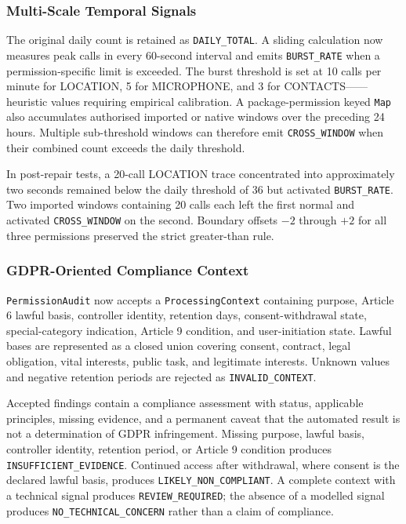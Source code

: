 \subsubsection{Multi-Scale Temporal Signals}

The original daily count is retained as \texttt{DAILY\_TOTAL}. A sliding calculation now measures peak calls in every 60-second interval and emits \texttt{BURST\_RATE} when a permission-specific limit is exceeded. The burst threshold is set at 10 calls per minute for LOCATION, 5 for MICROPHONE, and 3 for CONTACTS——heuristic values requiring empirical calibration. A package-permission keyed \texttt{Map} also accumulates authorised imported or native windows over the preceding 24 hours. Multiple sub-threshold windows can therefore emit \texttt{CROSS\_WINDOW} when their combined count exceeds the daily threshold.

In post-repair tests, a 20-call LOCATION trace concentrated into approximately two seconds remained below the daily threshold of 36 but activated \texttt{BURST\_RATE}. Two imported windows containing 20 calls each left the first normal and activated \texttt{CROSS\_WINDOW} on the second. Boundary offsets \(-2\) through \(+2\) for all three permissions preserved the strict greater-than rule.

\subsubsection{GDPR-Oriented Compliance Context}

\texttt{PermissionAudit} now accepts a \texttt{ProcessingContext} containing purpose, Article 6 lawful basis, controller identity, retention days, consent-withdrawal state, special-category indication, Article 9 condition, and user-initiation state. Lawful bases are represented as a closed union covering consent, contract, legal obligation, vital interests, public task, and legitimate interests. Unknown values and negative retention periods are rejected as \texttt{INVALID\_CONTEXT}.

Accepted findings contain a compliance assessment with status, applicable principles, missing evidence, and a permanent caveat that the automated result is not a determination of GDPR infringement. Missing purpose, lawful basis, controller identity, retention period, or Article 9 condition produces \texttt{INSUFFICIENT\_EVIDENCE}. Continued access after withdrawal, where consent is the declared lawful basis, produces \texttt{LIKELY\_NON\_COMPLIANT}. A complete context with a technical signal produces \texttt{REVIEW\_REQUIRED}; the absence of a modelled signal produces \texttt{NO\_TECHNICAL\_CONCERN} rather than a claim of compliance.

